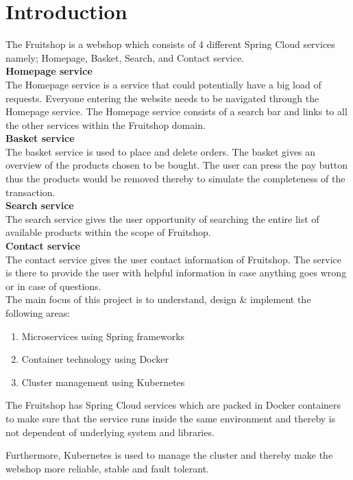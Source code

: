 \chapter{Introduction}\label{ch:introduction}

The Fruitshop is a webshop which consists of 4 different Spring Cloud services namely; Homepage, Basket, Search, and Contact service.\\ 


\textbf{Homepage service}\\
The Homepage service is a service that could potentially have a big load of requests. Everyone entering the website needs to be navigated through the Homepage service. 
The Homepage service consists of a search bar and links to all the other services within the Fruitshop domain.\\ 

\textbf{Basket service }\\
The basket service is used to place and delete orders. The basket gives an overview of the products chosen to be bought. The user can press the pay button thus the products would be removed thereby to simulate the completeness of the transaction.\\ 

\textbf{Search service }\\
The search service gives the user opportunity of searching the entire list of available products within the scope of Fruitshop. \\   

\textbf{Contact service}\\
The contact service gives the user contact information of Fruitshop. The service is there to provide the user with helpful information in case anything goes wrong or in case of questions.\\

The main focus of this project is to understand, design \& implement the following areas:  

\begin{enumerate}
	\item Microservices using Spring frameworks 
	\item Container technology using Docker
	\item Cluster management using Kubernetes
\end{enumerate}

The Fruitshop has Spring Cloud services which are packed in Docker containers to make sure that the service runs inside the same environment and thereby is not dependent of underlying system and libraries. 

Furthermore, Kubernetes is used to manage the cluster and thereby make the webshop more reliable, stable and fault tolerant. %





